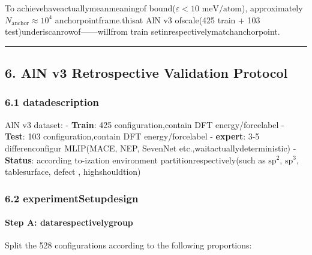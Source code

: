 \documentclass[
  12pt,
]{article}
\begin{document}
To achievehaveactuallymeanmeaningof bound(\(\varepsilon < 10\text{ meV/atom}\)), approximately
\(N_{\text{anchor}} \approx 10^4\) anchorpointframe.thisat AlN v3 ofscale(425 train
+ 103 test)underiscanrowof------willfrom train setinrespectivelymatchanchorpoint.

\begin{center}\rule{0.5\linewidth}{0.5pt}\end{center}

\subsection{6. AlN v3
Retrospective Validation Protocol}\label{aln-v3-ux56deux987eux6027ux9a8cux8bc1ux65b9ux6848}

\subsubsection{6.1 datadescription }\label{ux6570ux636eux63cfux8ff0}

AlN v3 dataset: - \textbf{Train}: 425  configuration,contain DFT energy/forcelabel  -
\textbf{Test}: 103  configuration,contain DFT energy/forcelabel  - \textbf{expert}: 3-5
 differenconfigur MLIP(MACE, NEP, SevenNet etc.,waitactuallydeterministic) - \textbf{Status}:
according to-ization environment partitionrespectively(such as \(\text{sp}^2\), \(\text{sp}^3\), tablesurface, defect ,
highshouldtion)

\subsubsection{6.2 experimentSetupdesign}\label{ux5b9eux9a8cux8bbeux8ba1}

\paragraph{Step A: datarespectivelygroup}\label{step-a-ux6570ux636eux5206ux7ec4}

Split the 528 configurations according to the following proportions:
\end{document}
